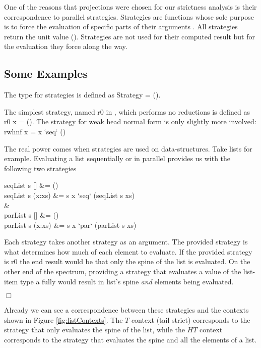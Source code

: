 One of the reasons that projections were chosen for our strictness analysis is
their correspondence to parallel strategies.  Strategies are functions whose
sole purpose is to force the evaluation of specific parts of their arguments
\citep{marlow2010seq, strategies}. All strategies return the unit value
\<()\>. Strategies are not used for their computed result but for the
evaluation they force along the way.

\subsection*{Some Examples}

The type for strategies is defined as \< Strategy \hasalpha =
\hasalpha \to ()\>.

The simplest strategy, named \<r0\> in \citep{marlow2010seq}, which performs
no reductions is defined as \<r0 x = ()\>. The strategy for weak head normal
form is only slightly more involved: \<rwhnf x = x `seq` ()\>

The real power comes when strategies are used on data-structures. Take
lists for example. Evaluating a list sequentially or in parallel provides us
with the following two strategies

\begin{haskell}
seqList s []     &= ()\\
seqList s (x:xs) &= s x `seq` (seqList s xs)\\
\quad&\quad\\
parList s []     &= ()\\
parList s (x:xs) &= s x `par` (parList s xs)
\end{haskell}

Each strategy takes another strategy as an argument. The provided
strategy is what determines how much of each element to evaluate. If the provided
strategy is \<r0\> the end result would be that only the spine of the list is
evaluated. On the other end of the spectrum, providing a strategy that evaluates a value
of the list-item type \<a\> fully would result in list's spine \emph{and} elements being evaluated.

\hfill$\Box$

Already we can see a correspondence between these strategies and the contexts shown
in Figure \ref{fig:listContexts}. The $T$ context (tail strict) corresponds to the strategy
that only evaluates the spine of the list, while the $HT$ context corresponds to the
strategy that evaluates the spine and all the elements of a list.


